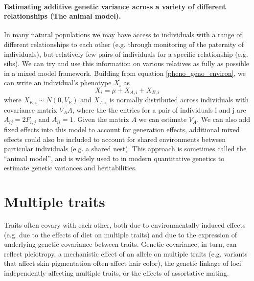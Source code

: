 \paragraph{Estimating additive genetic variance across a variety of
  different relationships (The animal model).}

In many natural populations we may have access to individuals with a
range of different relationships to each other (e.g. through monitoring
of the paternity of individuals), but relatively few pairs of individuals for a specific relationship (e.g. sibs). We can try and use this information on various relatives as
fully as possible in a mixed model framework. Building from equation
\ref{pheno_geno_environ}, we can write an individual's phenotype $X_i$
 as 
\begin{equation}
X_i =  \mu  + X_{A,i} + X_{E,i} 
\end{equation}
where $X_{E,i} \sim N(0,V_E)$  and $X_{A,i}$ is normally distributed across
individuals with covariance matrix $V_A A$, where the the entries for
a pair of individuals i and j are 
$A_{ij}= 2 F_{i,j}$ and $A_{ii}= 1$. Given the matrix $A$ we can estimate $V_A$. We can
also add fixed effects into this model to account for generation
effects, additional mixed effects could also be included to account
for shared environments between particular individuals (e.g. a shared nest).
This approach is sometimes called the ``animal model'', and is widely
used to in modern quantitative genetics to estimate genetic variances and heritabilities. 



\section{Multiple traits}
Traits often covary with each other, both due to environmentally
induced effects (e.g. due to the effects of diet on multiple traits)
and due to the expression of underlying genetic covariance between
traits. Genetic covariance, in turn, can reflect pleiotropy, a
mechanistic effect of an allele on multiple traits (e.g. variants that
affect skin pigmentation often affect hair color), the genetic
linkage of loci independently affecting multiple traits, or the
effects of assortative mating. 

